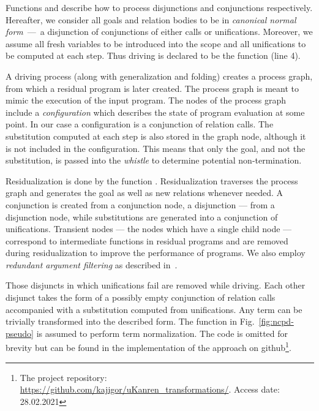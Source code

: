 Functions  and  describe how to process disjunctions and conjunctions respectively.
Hereafter, we consider all goals and relation bodies to be in \emph{canonical normal form}~---~a disjunction of conjunctions of either calls or unifications.
Moreover, we assume all fresh variables to be introduced into the scope and all unifications to be computed at each step.
Thus driving is declared to be the function  (line 4).

A driving process (along with generalization and folding) creates a process graph, from which a residual program is later created.
The process graph is meant to mimic the execution of the input program.
The nodes of the process graph include a \emph{configuration} which describes the state of program evaluation at some point.
In our case a configuration is a conjunction of relation calls.
The substitution computed at each step is also stored in the graph node, although it is not included in the configuration.
This means that only the goal, and not the substitution, is passed into the \emph{whistle} to determine potential non-termination.

Residualization is done by the function .
Residualization traverses the process graph and generates the \mk goal as well as new relations whenever needed.
A conjunction is created from a conjunction node, a disjunction --- from a disjunction node, while substitutions are generated into a conjunction of unifications.
Transient nodes --- the nodes which have a single child node --- correspond to intermediate functions in residual programs and are removed during residualization to improve the performance of programs.
We also employ \emph{redundant argument filtering} as described in~\cite{leuschel1996redundant}.

Those disjuncts in which unifications fail are removed while driving.
Each other disjunct takes the form of a possibly empty conjunction of relation calls accompanied with a substitution computed from unifications.
Any \mk term can be trivially transformed into the described form.
The function  in Fig.~\ref{fig:ncpd-pseudo} is assumed to perform term normalization.
The code is omitted for brevity but can be found in the implementation of the approach on github\footnote{The project repository: \url{https://github.com/kajigor/uKanren_transformations/}. Access date: 28.02.2021}.




